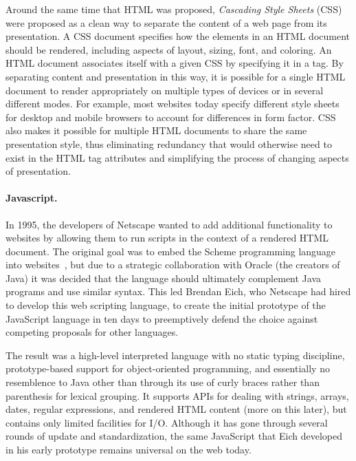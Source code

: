 \documentclass[11pt,twoside]{scrartcl}
\begin{document}
Around the same time that HTML was proposed, \emph{Cascading Style Sheets} (CSS) were proposed as a clean way to separate the content of a web page from its presentation. A CSS document specifies how the elements in an HTML document should be rendered, including aspects of layout, sizing, font, and coloring. An HTML document associates itself with a given CSS by specifying it in a tag. By separating content and presentation in this way, it is possible for a single HTML document to render appropriately on multiple types of devices or in several different modes. For example, most websites today specify different style sheets for desktop and mobile browsers to account for differences in form factor. CSS also makes it possible for multiple HTML documents to share the same presentation style, thus eliminating redundancy that would otherwise need to exist in the HTML tag attributes and simplifying the process of changing aspects of presentation.

\paragraph{Javascript.}
In 1995, the developers of Netscape wanted to add additional functionality to websites by allowing them to run scripts in the context of a rendered HTML document. The original goal was to embed the Scheme programming language into websites~\cite{Rauschmayer2014}, but due to a strategic collaboration with Oracle (the creators of Java) it was decided that the language should ultimately complement Java programs and use similar syntax. This led Brendan Eich, who Netscape had hired to develop this web scripting language, to create the initial prototype of the JavaScript language in ten days to preemptively defend the choice against competing proposals for other languages.

The result was a high-level interpreted language with no static typing discipline, prototype-based support for object-oriented programming, and essentially no resemblence to Java other than through its use of curly braces rather than parenthesis for lexical grouping. It supports APIs for dealing with strings, arrays, dates, regular expressions, and rendered HTML content (more on this later), but contains only limited facilities for I/O. Although it has gone through several rounds of update and standardization, the same JavaScript that Eich developed in his early prototype remains universal on the web today.
\end{document}

